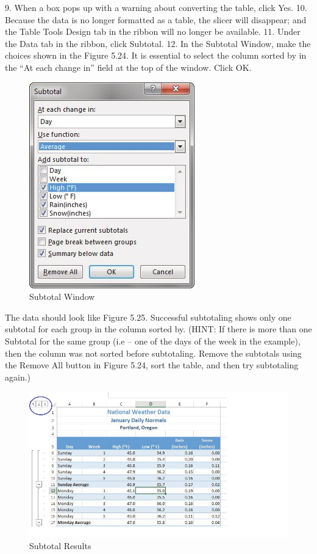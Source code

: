 9. When a box pops up with a warning about converting the table, click Yes.
10. Because the data is no longer formatted as a table, the slicer will disappear; and the Table Tools Design tab in the ribbon will no longer be available.
11. Under the Data tab in the ribbon, click Subtotal.
12. In the Subtotal Window, make the choices shown in the Figure 5.24. It is essential to select the column sorted by in the ``At each change in'' field at the top of the window. Click OK.


\begin{figure}[H]
	\centering
	\includegraphics[width=\maxwidth{.95\linewidth}]{gfx/ch05_fig24}
	\caption{Subtotal Window}
	\label{05:fig24}
\end{figure}

The data should look like Figure 5.25. Successful subtotaling shows only one subtotal for each group in the column sorted by. (HINT: If there is more than one Subtotal for the same group
(i.e – one of the days of the week in the example), then the column was not sorted before subtotaling. Remove the subtotals using the Remove All button in Figure 5.24, sort the table, and then try subtotaling again.)


\begin{figure}[H]
	\centering
	\includegraphics[width=\maxwidth{.95\linewidth}]{gfx/ch05_fig25}
	\caption{Subtotal Results}
	\label{05:fig25}
\end{figure}

